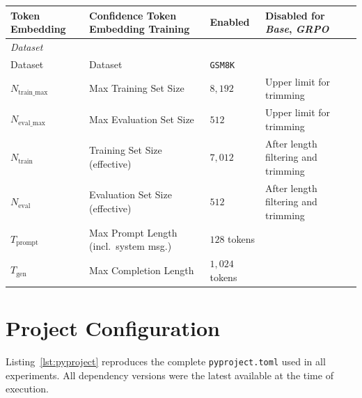 \documentclass[a4paper,oneside,10pt,ngerman,english]{scrartcl}
\begin{document}
\begin{landscape}
\begin{longtable}{llll}
		Token Embedding           & Confidence Token Embedding Training    & Enabled                             & Disabled for \textit{Base}, \textit{GRPO} \\
		\midrule
		\multicolumn{4}{l}{\textit{Dataset}}                                                                                                                 \\
		Dataset                   & Dataset                                & \texttt{GSM8K} \citep{gsm8k}        &                                           \\
		$N_{\mathrm{train\_max}}$ & Max Training Set Size                  & $8{,}192$                           & Upper limit for trimming                  \\
		$N_{\mathrm{eval\_max}}$  & Max Evaluation Set Size                & $512$                               & Upper limit for trimming                  \\
		$N_{\mathrm{train}}$      & Training Set Size (effective)          & $7{,}012$                           & After length filtering and trimming       \\
		$N_{\mathrm{eval}}$       & Evaluation Set Size (effective)        & $512$                               & After length filtering and trimming       \\
		$T_{\mathrm{prompt}}$     & Max Prompt Length (incl.\ system msg.) & $128$ tokens                        &                                           \\
		$T_{\mathrm{gen}}$        & Max Completion Length                  & $1{,}024$ tokens                    &                                           \\
	\end{longtable}
\end{landscape}

\cleardoubleoddpage

\section{Project Configuration}
\label{app:pyproject}

Listing~\ref{lst:pyproject} reproduces the complete \texttt{pyproject.toml} used in all experiments. All dependency versions were the latest available at the time of execution.



\cleardoubleoddpage
\end{document}
